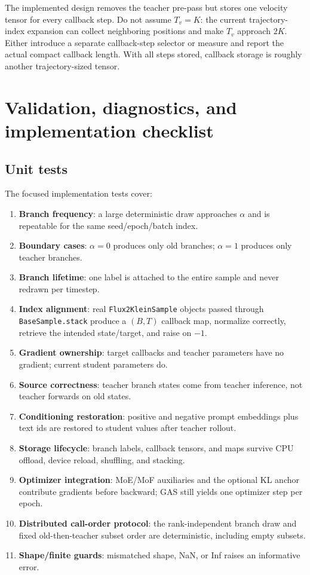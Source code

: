 \documentclass[11pt,a4paper]{article}
\theoremstyle{plain}
\theoremstyle{definition}
\begin{document}
The implemented design removes the teacher pre-pass but stores one velocity tensor for every callback
step.  Do not assume $T_v=K$: the current trajectory-index expansion can collect neighboring
positions and make $T_v$ approach $2K$.  Either introduce a separate callback-step selector or
measure and report the actual compact callback length.  With all steps stored, callback storage
is roughly another trajectory-sized tensor.

\section{Validation, diagnostics, and implementation checklist}
\label{sec:validation}

\subsection{Unit tests}

The focused implementation tests cover:
\begin{enumerate}[leftmargin=1.6em]
\item \textbf{Branch frequency}: a large deterministic draw approaches $\alpha$ and is repeatable
      for the same seed/epoch/batch index.
\item \textbf{Boundary cases}: $\alpha=0$ produces only old branches; $\alpha=1$ produces only
      teacher branches.
\item \textbf{Branch lifetime}: one label is attached to the entire sample and never redrawn per
      timestep.
\item \textbf{Index alignment}: real \texttt{Flux2KleinSample} objects passed through
      \texttt{BaseSample.stack} produce a $(B,T)$ callback map, normalize correctly, retrieve the
      intended state/target, and raise on $-1$.
\item \textbf{Gradient ownership}: target callbacks and teacher parameters have no gradient;
      current student parameters do.
\item \textbf{Source correctness}: teacher branch states come from teacher inference, not teacher
      forwards on old states.
\item \textbf{Conditioning restoration}: positive and negative prompt embeddings plus text ids are
      restored to student values after teacher rollout.
\item \textbf{Storage lifecycle}: branch labels, callback tensors, and maps survive CPU offload,
      device reload, shuffling, and stacking.
\item \textbf{Optimizer integration}: MoE/MoF auxiliaries and the optional KL anchor contribute
      gradients before backward; GAS still yields one optimizer step per epoch.
\item \textbf{Distributed call-order protocol}: the rank-independent branch draw and fixed
      old-then-teacher subset order are deterministic, including empty subsets.
\item \textbf{Shape/finite guards}: mismatched shape, NaN, or Inf raises an informative error.
\end{enumerate}
\end{document}
